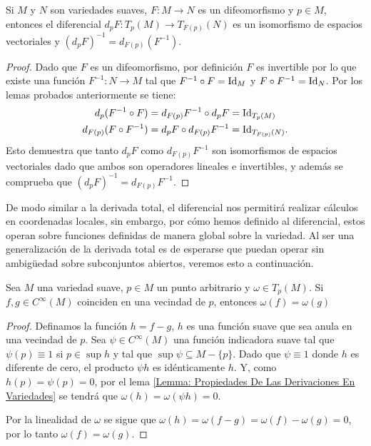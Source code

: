 \begin{lemma}\label{Lemma: Diferencial de un Difeomorfismo}
	Si $M$ y $N$ son variedades suaves, $F: M \to N$ es un difeomorfismo y $p \in M$, entonces el diferencial $d_pF: T_p(M) \to T_{F(p)}(N)$ es un isomorfismo de espacios vectoriales y $(d_pF)^{-1} = d_{F(p)}(F^{-1})$.
\end{lemma}

\begin{proof}
	Dado que $F$ es un difeomorfismo, por definición $F$ es invertible por lo que existe una función $F^{-1}: N \to M$ tal que $F^{-1} \circ F = \mathrm{Id}_M$ y $F \circ F^{-1} = \mathrm{Id}_N$. Por los lemas probados anteriormente se tiene:
	\begin{align*}
		d_p(F^{-1} \circ F)      & = d_{F(p)}F^{-1} \circ d_pF = \mathrm{Id}_{T_p(M)}       \\
		d_{F(p)}(F \circ F^{-1}) & = d_pF \circ d_{F(p)}F^{-1} = \mathrm{Id}_{T_{F(p)}(N)}. \\
	\end{align*}
	Esto demuestra que tanto $d_pF$ como $d_{F(p)}F^{-1}$ son isomorfismos de espacios vectoriales dado que ambos son operadores lineales e invertibles, y además se comprueba que $(d_pF)^{-1} = d_{F(p)}F^{-1}$.
\end{proof}

De modo similar a la derivada total, el diferencial nos permitirá realizar cálculos en coordenadas locales, sin embargo, por cómo hemos definido al diferencial, estos operan sobre funciones definidas de manera global sobre la variedad. Al ser una generalización de la derivada total es de esperarse que puedan operar sin ambigüedad sobre subconjuntos abiertos, veremos esto a continuación.

\begin{lemma}
	Sea $M$ una variedad suave, $p \in M$ un punto arbitrario y $\omega \in T_{p}(M)$. Si $f,g \in C^{\infty}(M)$ coinciden en una vecindad de $p$, entonces $\omega(f) = \omega(g)$
\end{lemma}

\begin{proof}
	Definamos la función $h = f - g$, $h$ es una función suave que sea anula en una vecindad de $p$. Sea $\psi \in C^{\infty}(M)$ una función indicadora suave tal que $\psi(p) \equiv 1$ si $p \in \sup h$ y tal que $\sup \psi \subseteq M - \{p\}$. Dado que $\psi \equiv 1$ donde $h$ es diferente de cero, el producto $\psi h$ es idénticamente $h$. Y, como $h(p) = \psi(p) = 0$, por el lema \ref{Lemma: Propiedades De Las Derivaciones En Variedades} se tendrá que $\omega (h) = \omega (\psi h) = 0$.

	Por la linealidad de $\omega$ se sigue que $\omega(h) = \omega (f - g) = \omega(f) - \omega(g) = 0$, por lo tanto $\omega(f) = \omega(g)$.
\end{proof}

